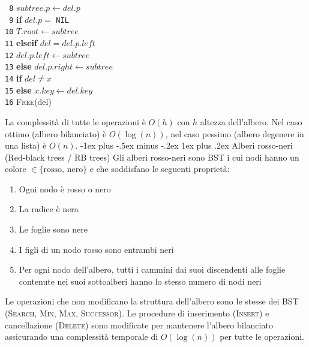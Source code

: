 \documentclass[10pt,landscape]{article}
\makeatletter
\renewcommand{\subsubsection}{\@startsection{subsubsection}{3}{0mm}%
                                {-1ex plus -.5ex minus -.2ex}%
                                {1ex plus .2ex}%
                                {\normalfont\normalsize\bfseries}}
\makeatother
\begin{document}
\begin{multicols*}{4}
\begin{multicols}{2}
                        \verb| 8|\hspace*{1.5em} $subtree.p \leftarrow del.p$\\
                        \verb| 9|\hspace*{0.5em} \textbf{if} $del.p =$ \verb|NIL|\\
                        \verb|10|\hspace*{1.5em} $T.root \leftarrow subtree$\\
                        \verb|11|\hspace*{0.5em} \textbf{elseif} $del = del.p.left$\\
                        \verb|12|\hspace*{1.5em} $del.p.left \leftarrow subtree$\\
                        \verb|13|\hspace*{0.5em} \textbf{else} $del.p.right \leftarrow subtree$\\
                        \verb|14|\hspace*{0.5em} \textbf{if} $del \neq x$\\
                        \verb|15|\hspace*{1.5em} \textbf{else} $x.key \leftarrow del.key$\\
                        \verb|16|\hspace*{0.5em} \textsc{Free}(del)\\
                \end{multicols}
                La complessità di tutte le operazioni è $O(h)$ con $h$ altezza dell'albero. Nel caso ottimo (albero bilanciato) è $O(\log(n))$, nel caso pessimo (albero degenere in una lista) è $O(n)$.
                \subsubsection{Alberi rosso-neri (Red-black trees / RB trees)}
                Gli alberi rosso-neri sono BST i cui nodi hanno un colore $\in \{\text{rosso, nero}\}$ e che soddisfano le seguenti proprietà:
                \begin{enumerate}[left=1em, itemsep=1pt]
                        \item Ogni nodo è rosso o nero
                        \item La radice è nera
                        \item Le foglie sono nere
                        \item I figli di un nodo rosso sono entrambi neri
                        \item Per ogni nodo dell’albero, tutti i cammini dai suoi discendenti alle foglie contenute nei suoi sottoalberi hanno lo stesso numero di nodi neri
                \end{enumerate}
                Le operazioni che non modificano la struttura dell'albero sono le stesse dei BST (\textsc{Search, Min, Max, Successor}). Le procedure di inserimento (\textsc{Insert}) e cancellazione (\textsc{Delete}) sono modificate per mantenere l'albero bilanciato assicurando una complessità temporale di $O(\log(n))$ per tutte le operazioni.

\end{multicols*}
\end{document}
